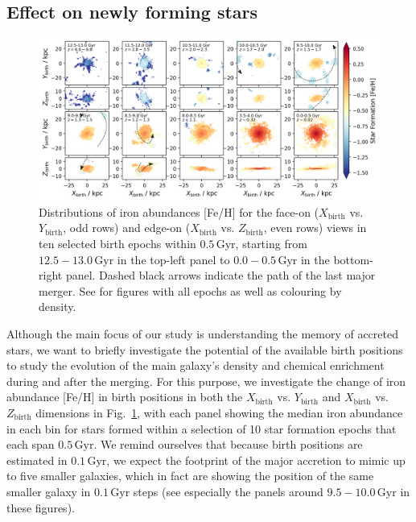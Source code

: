 \documentclass[fleqn,usenatbib]{mnras}
\begin{document}
\subsection{Effect on newly forming stars}

\begin{figure}
    \centering
    \includegraphics[width=\textwidth]{figures/trace_star_formation_xy_xz_feh_selection.png}
    \caption{Distributions of iron abundances {[Fe/H]} for the face-on ($X_\mathrm{birth}$ vs. $Y_\mathrm{birth}$, odd rows) and edge-on ($X_\mathrm{birth}$ vs. $Z_\mathrm{birth}$, even rows) views in ten selected birth epochs within $0.5\,\mathrm{Gyr}$, starting from $12.5-13.0\,\mathrm{Gyr}$ in the top-left panel to $0.0-0.5\,\mathrm{Gyr}$ in the bottom-right panel. Dashed black arrows indicate the path of the last major merger. See \href{https://github.com/svenbuder/gse_nihaouhd/tree/main/figures}{\faGithub} for figures with all epochs as well as colouring by density.}
    \label{fig:trace_star_formation_xy_xz_feh_selection}
\end{figure}

Although the main focus of our study is understanding the memory of accreted stars, we want to briefly investigate the potential of the available birth positions to study the evolution of the main galaxy's density and chemical enrichment during and after the merging. For this purpose, we investigate the change of iron abundance [Fe/H] in birth positions in both the $X_\mathrm{birth}$ vs. $Y_\mathrm{birth}$ and $X_\mathrm{birth}$ vs. $Z_\mathrm{birth}$ dimensions in Fig.~\ref{fig:trace_star_formation_xy_xz_feh_selection}, with each panel showing the median iron abundance in each bin for stars formed within a selection of 10 star formation epochs that each span $0.5\,\mathrm{Gyr}$. We remind ourselves that because birth positions are estimated in $0.1\,\mathrm{Gyr}$, we expect the footprint of the major accretion to mimic up to five smaller galaxies, which in fact are showing the position of the same smaller galaxy in $0.1\,\mathrm{Gyr}$ steps (see especially the panels around $9.5-10.0\,\mathrm{Gyr}$ in these figures).
\end{document}
